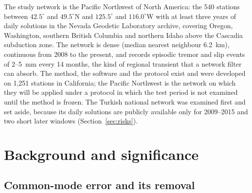 \documentclass[preprint,12pt,authoryear]{elsarticle}
\begin{document}
The study network is the Pacific Northwest of North America: the 540 stations between $42.5^\circ$ and $49.5^\circ$N and $125.5^\circ$ and $116.0^\circ$W with at least three years of daily solutions in the Nevada Geodetic Laboratory archive, covering Oregon, Washington, southern British Columbia and northern Idaho above the Cascadia subduction zone. The network is dense (median nearest neighbour 6.2~km), continuous from 2008 to the present, and records episodic tremor and slip events of 2--5~mm every 14 months, the kind of regional transient that a network filter can absorb. The method, the software and the protocol exist and were developed on 1,251 stations in California; the Pacific Northwest is the network on which they will be applied under a protocol in which the test period is not examined until the method is frozen. The Turkish national network was examined first and set aside, because its daily solutions are publicly available only for 2009--2015 and two short later windows (Section~\ref{sec:risks}).

\section{Background and significance}
\label{sec:background}

\subsection{Common-mode error and its removal}
\end{document}
